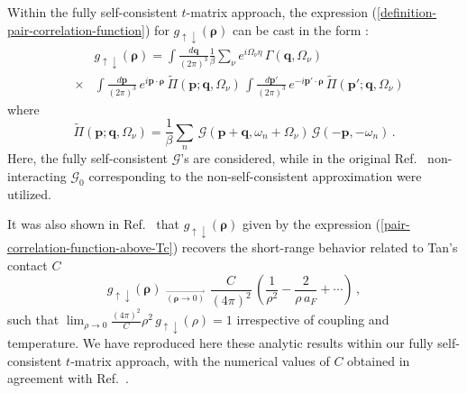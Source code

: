 \documentclass[pra,twocolumn,aps,amssymb,showpacs,superscriptaddress]{revtex4-1}
\begin{document}
Within the fully self-consistent $t$-matrix approach, the expression (\ref{definition-pair-correlation-function}) for $g_{\uparrow \downarrow}(\boldsymbol{\rho})$ can be cast in the form \cite{Palestini-2014}:
\begin{eqnarray}
& & g_{\uparrow \downarrow}(\boldsymbol{\rho}) = \int \! \frac{d{\mathbf q}}{(2\pi)^{3}} \frac{1}{\beta} \sum_{\nu} e^{i \Omega_{\nu} \eta} \, \Gamma(\mathbf{q},\Omega_{\nu}) 
\label{pair-correlation-function-above-Tc} \\
& \times & \!\! \int \! \frac{d\mathbf{p}}{(2 \pi)^{3}} \, e^{i \mathbf{p} \cdot \boldsymbol{\rho}} \, \tilde{\Pi}(\mathbf{p};\mathbf{q},\Omega_{\nu}) \, 
                       \int \! \frac{d\mathbf{p}'}{(2 \pi)^{3}} \, e^{-i \mathbf{p}' \cdot \boldsymbol{\rho}} \, \tilde{\Pi}(\mathbf{p}';\mathbf{q},\Omega_{\nu}) 
\nonumber 
\end{eqnarray}
where
\begin{equation}
\tilde{\Pi}(\mathbf{p};\mathbf{q},\Omega_{\nu}) = \frac{1}{\beta} \sum_{n} \, \mathcal{G}(\mathbf{p}+\mathbf{q},\omega_{n}+\Omega_{\nu}) \, \mathcal{G}(-\mathbf{p},-\omega_{n}) \, .
\label{Pi}
\end{equation}
Here, the fully self-consistent $\mathcal{G}$'s are considered, while in the original Ref.~\cite{Palestini-2014} non-interacting $\mathcal{G}_{0}$ corresponding to the non-self-consistent approximation were utilized.

It was also shown in Ref.~\cite{Palestini-2014} that $g_{\uparrow \downarrow}(\boldsymbol{\rho})$ given by the expression (\ref{pair-correlation-function-above-Tc}) recovers the short-range behavior 
related to Tan's contact $C$ \cite{Tan-2008_a,Tan-2008_b,Braaten-2012}
\begin{equation}
g_{\uparrow \downarrow}(\boldsymbol{\rho}) \,\,  _{\overrightarrow{(\boldsymbol{\rho}\rightarrow 0)}} \,\, \frac{C}{(4 \pi)^{2}} \, \left( \frac{1}{\rho^{2}} - \frac{2}{\rho \, a_{F}} + \cdots \right) \, ,
\label{contact-BCS-2}
\end{equation}
such that $\lim_{\rho \to 0} \frac{(4 \pi)^{2}}{C} \rho^{2} \, g_{\uparrow \downarrow}(\rho)= 1$ irrespective of coupling and temperature.
We have reproduced here these analytic results within our fully self-consistent $t$-matrix approach, with the numerical values of $C$ obtained in agreement with Ref.~\cite{PPS-2019}. 
\end{document}
